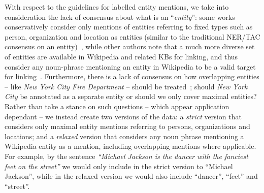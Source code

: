 \documentclass{llncs}
\begin{document}
With respect to the guidelines for labelled entity mentions, we take into consideration the lack of consensus about what is an ``\textit{entity}'': some works conservatively consider only mentions of entities referring to fixed types such as person, organization and location as entities (similar to the traditional NER/TAC consensus on an entity)~\cite{ourAMW2018}, while other authors note that a much more diverse set of entities are available in Wikipedia and related KBs for linking, and thus consider any noun-phrase mentioning an entity in Wikipedia to be a valid target for linking~\cite{ourAMW2018}. Furthermore, there is a lack of consensus on how overlapping entities -- like \textit{New York City Fire Department} -- should be treated~\cite{ourAMW2018}; should \textit{New York City} be annotated as a separate entity or should we only cover maximal entities? Rather than take a stance on such questions -- which appear application dependant -- we instead create two versions of the data: a \textit{strict} version that considers only maximal entity mentions referring to persons, organizations and locations; and a \textit{relaxed} version that considers any noun phrase mentioning a Wikipedia entity as a mention, including overlapping mentions where applicable. For example, by the sentence \textit{``Michael Jackson is the dancer with the fanciest feet on the street''} we would only include in the strict version to ``Michael Jackson'', while in the relaxed version we would also include ``dancer'', ``feet'' and ``street''.

\end{document}
